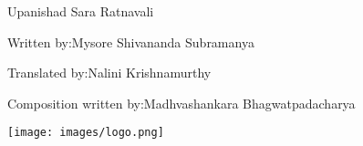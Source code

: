 \thispagestyle{empty}

Upanishad Sara Ratnavali

Written by:Mysore Shivananda Subramanya

Translated by:Nalini Krishnamurthy

Composition written by:Madhvashankara Bhagwatpadacharya

\texttt{[image: images/logo.png]}

